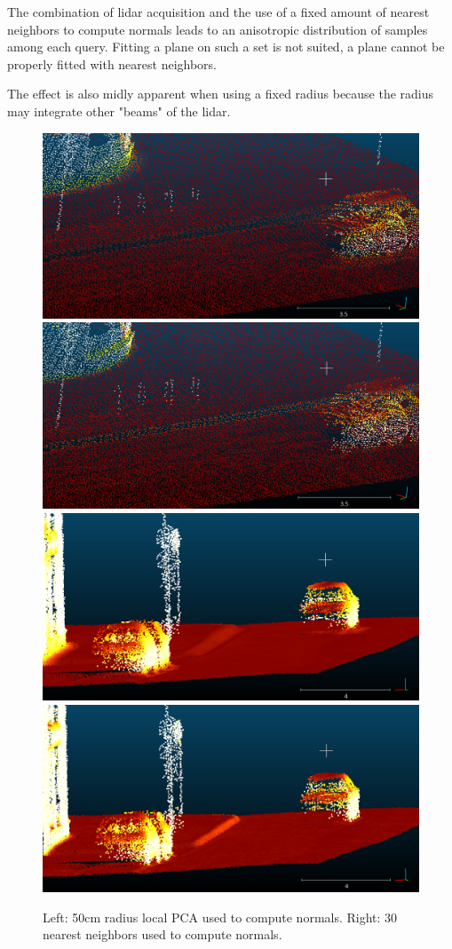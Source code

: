 \documentclass[a4paper]{article}
\begin{document}
The combination of lidar acquisition and the use of a fixed amount of nearest neighbors 
to compute normals leads to an anisotropic distribution of samples among each query.
Fitting a plane on such a set is not suited, a plane cannot be properly fitted with nearest neighbors.

The effect is also midly apparent when using a fixed radius because the radius may integrate other "beams" of the lidar.


\begin{figure}[ht]
  \centering
  \includegraphics[width=0.46\linewidth]{figures/cc_normals_PCA_r=50cm_smooth.png}
  \includegraphics[width=0.46\linewidth]{figures/cc_normals_PCA_50cm_k=30_nearest.png}
  \includegraphics[width=0.46\linewidth]{figures/cc_normals_PCA_r=50cm_v2.png}
  \includegraphics[width=0.46\linewidth]{figures/cc_normals_PCA_50cm_k=30_v2.png}
  \caption{Left: 50cm radius local PCA used to compute normals. 
  Right: 30 nearest neighbors used to compute normals.} 
  \label{fig:local_PCA_neighbor}
\end{figure}
\end{document}
